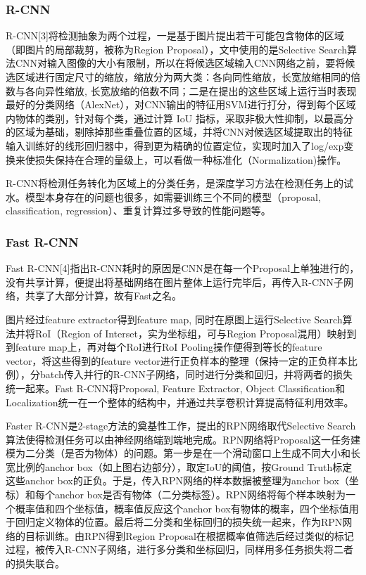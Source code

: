 \documentclass[journal,transmag]{IEEEtran}
\begin{document}
\subsubsection{R-CNN}
R-CNN[3]将检测抽象为两个过程，一是基于图片提出若干可能包含物体的区域（即图片的局部裁剪，被称为Region Proposal），文中使用的是Selective Search算法CNN对输入图像的大小有限制，所以在将候选区域输入CNN网络之前，要将候选区域进行固定尺寸的缩放，缩放分为两大类：各向同性缩放，长宽放缩相同的倍数与各向异性缩放, 长宽放缩的倍数不同；二是在提出的这些区域上运行当时表现最好的分类网络（AlexNet），对CNN输出的特征用SVM进行打分，得到每个区域内物体的类别，针对每个类，通过计算 IoU 指标，采取非极大性抑制，以最高分的区域为基础，剔除掉那些重叠位置的区域，并将CNN对候选区域提取出的特征输入训练好的线形回归器中，得到更为精确的位置定位，实现时加入了log/exp变换来使损失保持在合理的量级上，可以看做一种标准化（Normalization)操作。

R-CNN将检测任务转化为区域上的分类任务，是深度学习方法在检测任务上的试水。模型本身存在的问题也很多，如需要训练三个不同的模型（proposal, classification, regression）、重复计算过多导致的性能问题等。
\subsubsection{Fast R-CNN}
Fast R-CNN[4]指出R-CNN耗时的原因是CNN是在每一个Proposal上单独进行的，没有共享计算，便提出将基础网络在图片整体上运行完毕后，再传入R-CNN子网络，共享了大部分计算，故有Fast之名。

图片经过feature extractor得到feature map, 同时在原图上运行Selective Search算法并将RoI（Region of Interset，实为坐标组，可与Region Proposal混用）映射到到feature map上，再对每个RoI进行RoI Pooling操作便得到等长的feature vector，将这些得到的feature vector进行正负样本的整理（保持一定的正负样本比例），分batch传入并行的R-CNN子网络，同时进行分类和回归，并将两者的损失统一起来。Fast R-CNN将Proposal, Feature Extractor, Object Classification和Localization统一在一个整体的结构中，并通过共享卷积计算提高特征利用效率。

Faster R-CNN是2-stage方法的奠基性工作，提出的RPN网络取代Selective Search算法使得检测任务可以由神经网络端到端地完成。RPN网络将Proposal这一任务建模为二分类（是否为物体）的问题。第一步是在一个滑动窗口上生成不同大小和长宽比例的anchor box（如上图右边部分），取定IoU的阈值，按Ground Truth标定这些anchor box的正负。于是，传入RPN网络的样本数据被整理为anchor box（坐标）和每个anchor box是否有物体（二分类标签）。RPN网络将每个样本映射为一个概率值和四个坐标值，概率值反应这个anchor box有物体的概率，四个坐标值用于回归定义物体的位置。最后将二分类和坐标回归的损失统一起来，作为RPN网络的目标训练。由RPN得到Region Proposal在根据概率值筛选后经过类似的标记过程，被传入R-CNN子网络，进行多分类和坐标回归，同样用多任务损失将二者的损失联合。
\end{document}
